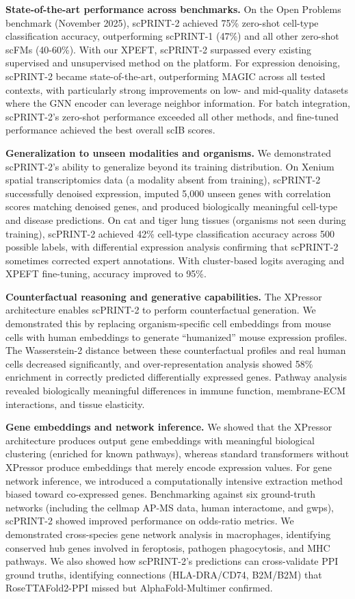 \textbf{State-of-the-art performance across benchmarks.} On the Open Problems benchmark (November 2025), \gls{scPRINT}-2 achieved 75\% zero-shot cell-type classification accuracy, outperforming \gls{scPRINT}-1 (47\%) and all other zero-shot \gls{scFM}s (40-60\%). With our \gls{XPEFT}, \gls{scPRINT}-2 surpassed every existing supervised and unsupervised method on the platform. For expression denoising, \gls{scPRINT}-2 became state-of-the-art, outperforming MAGIC across all tested contexts, with particularly strong improvements on low- and mid-quality datasets where the \gls{GNN} encoder can leverage neighbor information. For batch integration, \gls{scPRINT}-2's zero-shot performance exceeded all other methods, and fine-tuned performance achieved the best overall \gls{scIB} scores.

\textbf{Generalization to unseen modalities and organisms.} We demonstrated \gls{scPRINT}-2's ability to generalize beyond its training distribution. On Xenium spatial transcriptomics data (a modality absent from training), \gls{scPRINT}-2 successfully denoised expression, imputed 5,000 unseen genes with correlation scores matching denoised genes, and produced biologically meaningful cell-type and disease predictions. On cat and tiger lung tissues (organisms not seen during training), \gls{scPRINT}-2 achieved 42\% cell-type classification accuracy across 500 possible labels, with differential expression analysis confirming that \gls{scPRINT}-2 sometimes corrected expert annotations. With cluster-based logits averaging and \gls{XPEFT} fine-tuning, accuracy improved to 95\%.

\textbf{Counterfactual reasoning and generative capabilities.} The XPressor architecture enables \gls{scPRINT}-2 to perform counterfactual generation. We demonstrated this by replacing organism-specific cell embeddings from mouse cells with human embeddings to generate ``humanized'' mouse expression profiles. The Wasserstein-2 distance between these counterfactual profiles and real human cells decreased significantly, and over-representation analysis showed 58\% enrichment in correctly predicted differentially expressed genes. Pathway analysis revealed biologically meaningful differences in immune function, membrane-\gls{ECM} interactions, and tissue elasticity.

\textbf{Gene embeddings and network inference.} We showed that the XPressor architecture produces output gene embeddings with meaningful biological clustering (enriched for known pathways), whereas standard transformers without XPressor produce embeddings that merely encode expression values. For gene network inference, we introduced a computationally intensive extraction method biased toward co-expressed genes. Benchmarking against six ground-truth networks (including the cellmap \gls{AP-MS} data, human interactome, and \gls{gwps}), \gls{scPRINT}-2 showed improved performance on odds-ratio metrics. We demonstrated cross-species gene network analysis in macrophages, identifying conserved hub genes involved in feroptosis, pathogen phagocytosis, and \gls{MHC} pathways. We also showed how \gls{scPRINT}-2's predictions can cross-validate \gls{PPI} ground truths, identifying connections (HLA-DRA/CD74, B2M/B2M) that RoseTTAFold2-\gls{PPI} missed but AlphaFold-Multimer confirmed.

